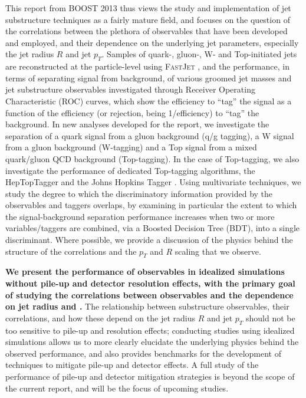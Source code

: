 This report from BOOST 2013 thus views the study and implementation of jet substructure techniques as a fairly
mature field, and focuses on the question of the correlations between the plethora of observables that have been developed 
and employed, and their dependence on the underlying jet parameters, especially the jet radius $R$ and jet $p_T$. Samples of quark-, gluon-, W- and Top-initiated jets are reconstructed at the particle-level using \textsc{FastJet} \cite{Cacciari:2011ma}, and the performance, in terms of separating signal from background, of various groomed jet masses and jet substructure observables investigated through Receiver Operating Characteristic (ROC) curves, which show the efficiency to ``tag'' the signal as a function of the efficiency (or rejection, being 1/efficiency) to ``tag'' the background. In new analyses developed for the report, we investigate the separation of a quark signal from a gluon background (q/g tagging), a W signal from a gluon background (W-tagging) and a Top signal from a mixed quark/gluon QCD background (Top-tagging). In the case of Top-tagging, we also investigate the performance of dedicated Top-tagging algorithms, the HepTopTagger \cite{Plehn:2010st} and the Johns Hopkins Tagger \cite{Kaplan:2008ie}. Using multivariate techniques, we study the degree to which the discriminatory information provided by the observables and taggers overlaps, by examining in particular the extent to which the signal-background separation performance increases when two or more variables/taggers are combined, via a Boosted Decision Tree (BDT), into a single discriminant. Where possible, we provide a discussion of the physics behind the structure of the correlations and the $p_{T}$ and $R$ scaling that we observe. 

{\bf We present the performance of observables in idealized simulations without pile-up and detector resolution effects, with the primary goal of studying the correlations between observables and the dependence on jet radius and \pt.}
The relationship between substructure observables, their correlations, and how these depend on the jet radius $R$ and jet $p_T$ should not be too sensitive to pile-up and resolution effects; conducting  studies using idealized simulations allows us to more clearly elucidate the underlying physics behind the observed performance, and also provides benchmarks for the development of techniques to mitigate pile-up and detector effects. A full study of the performance of pile-up and detector mitigation strategies is beyond the scope of the current report, and will be the focus of upcoming studies.


